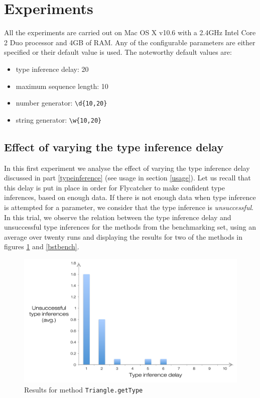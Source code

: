 \section{Experiments}
All the experiments are carried out on Mac OS X v10.6 with a 2.4GHz Intel Core 2 Duo processor and 4GB of RAM. Any of the configurable parameters are either specified or their default value is used. The noteworthy default values are:

\begin{itemize}
   \item type inference delay: 20
   \item maximum sequence length: 10
   \item number generator: \texttt{\textbackslash d\{10,20\}}
   \item string generator: \texttt{\textbackslash w\{10,20\}}
\end{itemize}

\subsection{Effect of varying the type inference delay}
In this first experiment we analyse the effect of varying the type inference delay discussed in part \ref{typeinference} (see usage in section \ref{usage}). Let us recall that this delay is put in place in order for \textsf{Flycatcher} to make confident type inferences, based on enough data. If there is not enough data when type inference is attempted for a parameter, we consider that the type inference is \emph{unsuccessful}. In this trial, we observe the relation between the type inference delay and unsuccessful type inferences for the methods from the benchmarking set, using an average over twenty runs and displaying the results for two of the methods in figures \ref{trianglebench} and \ref{bstbench}.

\begin{figure}[h]
\hspace*{-0.5cm}
\centering
\includegraphics[scale=0.55]{./components/chapter7/triangle.pdf}
\caption{Results for method \texttt{Triangle.getType}}
\label{trianglebench}
\end{figure}


